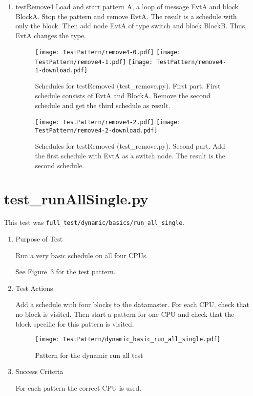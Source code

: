 \documentclass[12pt,a4paper]{report}
\begin{document}
\begin{enumerate}
\item testRemove4
    Load and start pattern A, a loop of message EvtA and block BlockA.
    Stop the pattern and remove EvtA. The result is a schedule with only
    the block. Then add node EvtA of type switch and block BlockB. Thus,
    EvtA changes the type.
    \begin{figure}
        \centering
        \texttt{[image: TestPattern/remove4-0.pdf]}
        \texttt{[image: TestPattern/remove4-1.pdf]}
        \texttt{[image: TestPattern/remove4-1-download.pdf]}
        \caption{Schedules for testRemove4 (test\_remove.py). First part.
        First schedule consists of EvtA and BlockA. Remove the second schedule and get
        the third schedule as result.}
        \label{fig:Schedules_for_testRemove4-1}
    \end{figure}
    \begin{figure}
        \centering
        \texttt{[image: TestPattern/remove4-2.pdf]}
        \texttt{[image: TestPattern/remove4-2-download.pdf]}
        \caption{Schedules for testRemove4 (test\_remove.py). Second part.
        Add the first schedule with EvtA as a switch node. The result
        is the second schedule.}
        \label{fig:Schedules_for_testRemove4-2}
    \end{figure}

\end{enumerate}

\section{test\_runAllSingle.py}
This test was \texttt{full\_test/dynamic/basics/run\_all\_single}.
\begin{enumerate}
  \item Purpose of Test

    Run a very basic schedule on all four CPUs.

  See Figure~\ref{fig:Pattern_for_the_dynamic_run_all_test} for the test pattern.
  \item Test Actions

  Add a schedule with four blocks to the datamaster. For each CPU,
  check that no block is visited. Then start a pattern for one CPU and
  check that the block specific for this pattern is visited.
    \begin{figure}
        \centering
        \texttt{[image: TestPattern/dynamic\_basic\_run\_all\_single.pdf]}
        \caption{Pattern for the dynamic run all test}
        \label{fig:Pattern_for_the_dynamic_run_all_test}
    \end{figure}
  \item Success Criteria

  For each pattern the correct CPU is used.
\end{enumerate}
\end{document}
